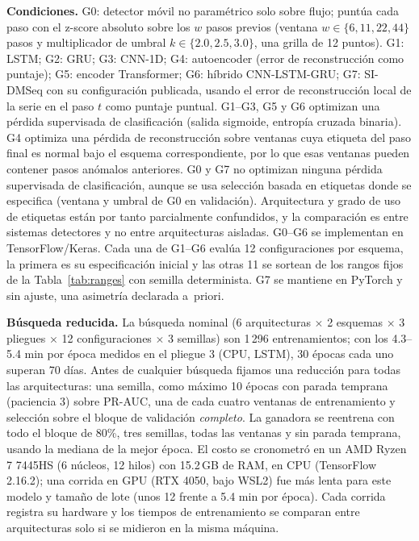 \documentclass[conference]{IEEEtran}
\begin{document}
\textbf{Condiciones.} G0: detector m\'ovil no param\'etrico solo sobre flujo;
punt\'ua cada paso con el z-score absoluto sobre los $w$ pasos previos (ventana
$w\in\{6,11,22,44\}$ pasos y multiplicador de umbral $k\in\{2.0,2.5,3.0\}$,
una grilla de 12 puntos). G1:
LSTM; G2: GRU; G3: CNN-1D; G4: autoencoder (error de reconstrucci\'on como
puntaje); G5: encoder Transformer; G6: h\'ibrido CNN-LSTM-GRU; G7: SI-DMSeq
\cite{nouri2025sidmseq} con su configuraci\'on publicada, usando el error de
reconstrucci\'on local de la serie en el paso $t$ como puntaje puntual. G1--G3,
G5 y G6 optimizan una p\'erdida supervisada de clasificaci\'on (salida sigmoide,
entrop\'ia cruzada binaria). G4 optimiza una p\'erdida de reconstrucci\'on sobre
ventanas cuya etiqueta del paso final es normal bajo el esquema
correspondiente, por lo que esas ventanas pueden contener pasos an\'omalos
anteriores. G0 y G7 no optimizan ninguna p\'erdida supervisada de
clasificaci\'on, aunque se usa selecci\'on basada en etiquetas donde se
especifica (ventana y umbral de G0 en validaci\'on). Arquitectura y grado de
uso de etiquetas est\'an por tanto parcialmente confundidos, y la comparaci\'on
es entre sistemas detectores y no entre arquitecturas aisladas. G0--G6 se
implementan en TensorFlow/Keras. Cada una de G1--G6 eval\'ua 12 configuraciones
por esquema, la primera es su especificaci\'on inicial y las otras 11 se
sortean de los rangos fijos de la Tabla~\ref{tab:ranges} con semilla
determinista. G7 se mantiene en PyTorch y
sin ajuste, una asimetr\'ia declarada a~priori.

\textbf{B\'usqueda reducida.} La b\'usqueda nominal (6 arquitecturas $\times$ 2
esquemas $\times$ 3 pliegues $\times$ 12 configuraciones $\times$ 3 semillas)
son 1\,296 entrenamientos; con los 4.3--5.4 min por \'epoca medidos en el
pliegue 3 (CPU, LSTM), 30 \'epocas cada uno superan 70 d\'ias. Antes de
cualquier b\'usqueda fijamos una reducci\'on para todas las arquitecturas: una
semilla, como m\'aximo 10 \'epocas con parada temprana (paciencia 3) sobre
PR-AUC, una de cada cuatro ventanas de entrenamiento y selecci\'on sobre el
bloque de validaci\'on \emph{completo}. La ganadora se reentrena con todo el
bloque de 80\%, tres semillas, todas las ventanas y sin parada temprana,
usando la mediana de la mejor \'epoca. El costo se cronometr\'o en un AMD Ryzen 7 7445HS
(6 n\'ucleos, 12 hilos) con 15.2\,GB de RAM, en CPU (TensorFlow 2.16.2); una
corrida en GPU (RTX 4050, bajo WSL2) fue m\'as lenta para este modelo y tama\~no
de lote (unos 12 frente a 5.4 min por \'epoca). Cada corrida registra su
hardware y los tiempos de entrenamiento se comparan entre arquitecturas solo si
se midieron en la misma m\'aquina.
\end{document}
